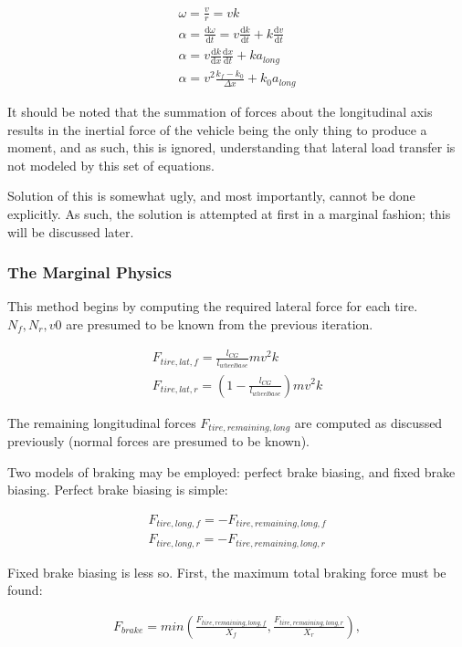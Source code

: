 \documentclass{article}
\def\D{\mathrm{d}}
\begin{document}
\begin{align}
	\omega = \frac{v}{r} = v k \\
	\alpha = \frac{\D \omega}{\D t} = v \frac{\D k}{\D t} + k \frac{\D v}{\D t} \\
	\alpha = v \frac{\D k}{\D x} \frac{\D x}{\D t} + k a_{long} \\
	\alpha = v^2 \frac{k_f - k_0}{\Delta x} + k_0 a_{long}
\end{align}

It should be noted that the summation of forces about the longitudinal axis results in the inertial force of the vehicle being the only thing to produce a moment, and as such, this is ignored, understanding that lateral load transfer is not modeled by this set of equations.

Solution of this is somewhat ugly, and most importantly, cannot be done explicitly. As such, the solution is attempted at first in a marginal fashion; this will be discussed later.

\subsubsection{The Marginal Physics}
This method begins by computing the required lateral force for each tire. $N_f, N_r, v0$ are presumed to be known from the previous iteration.

\begin{align}
	F_{tire,lat,f} = \frac{l_{CG}}{l_{wheelbase}} m v^2 k \\ 
	F_{tire,lat,r} = (1-\frac{l_{CG}}{l_{wheelbase}}) m v^2 k
\end{align}

The remaining longitudinal forces $F_{tire,remaining,long}$ are computed as discussed previously (normal forces are presumed to be known). 

Two models of braking may be employed: perfect brake biasing, and fixed brake biasing. Perfect brake biasing is simple:

\begin{align}
	F_{tire,long,f} = -F_{tire,remaining,long,f} \\
	F_{tire,long,r} = -F_{tire,remaining,long,r}
\end{align}

Fixed brake biasing is less so. First, the maximum total braking force must be found:

\begin{align}
	F_{brake} = min(\frac{F_{tire,remaining,long,f}}{X_{f}}, \frac{F_{tire,remaining,long,r}}{X_{r}}),
\end{align}
\end{document}
